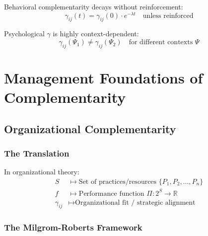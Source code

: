 \begin{axiom}
Behavioral complementarity decays without reinforcement:
\begin{equation}
\gamma_{ij}(t) = \gamma_{ij}(0) \cdot e^{-\lambda t} \quad \text{unless reinforced}
\end{equation}
\end{axiom}

\begin{axiom}
Psychological $\gamma$ is highly context-dependent:
\begin{equation}
\gamma_{ij}(\Psi_1) \neq \gamma_{ij}(\Psi_2) \quad \text{for different contexts } \Psi
\end{equation}
\end{axiom}

\section{Management Foundations of Complementarity}
\label{sec:management}

\subsection{Organizational Complementarity}

\subsubsection{The Translation}

\begin{axiom}
In organizational theory:
\begin{align}
S &\mapsto \text{Set of practices/resources } \{P_1, P_2, \ldots, P_n\} \\
f &\mapsto \text{Performance function } \Pi: 2^S \to \mathbb{R} \\
\gamma_{ij} &\mapsto \text{Organizational fit / strategic alignment}
\end{align}
\end{axiom}

\subsubsection{The Milgrom-Roberts Framework}

